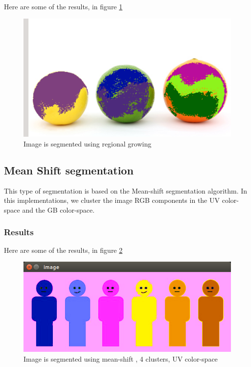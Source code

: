 \documentclass[letterpaper, 12 pt, conference ,onecolumn]{ieeeconf}  %
\begin{document}
Here are some of the results, in figure \ref{fig:regional-growing}
\begin{figure}[h!]
\includegraphics[width=0.4\paperwidth]{regional-growing/regional-growing}
\centering
\caption{Image is segmented using regional growing }
\label{fig:regional-growing}
\end{figure}

\subsection*{Mean Shift segmentation}
This type of segmentation is based on the Mean-shift segmentation algorithm. In this  implementations, we cluster the image RGB components in the UV color-space and the GB color-space.


\subsubsection*{\textbf{Results}}  

Here are some of the results, in figure \ref{fig:mean-shift-4}
\begin{figure}[h!]
\includegraphics[width=0.4\paperwidth]{mean-shift/window128-4cluster}
\centering
\caption{Image is segmented using mean-shift , 4 clusters, UV color-space }
\label{fig:mean-shift-4}
\end{figure}
\end{document}
